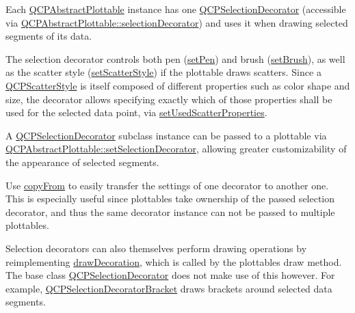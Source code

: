 Each \mbox{\hyperlink{class_q_c_p_abstract_plottable}{Q\+C\+P\+Abstract\+Plottable}} instance has one \mbox{\hyperlink{class_q_c_p_selection_decorator}{Q\+C\+P\+Selection\+Decorator}} (accessible via \mbox{\hyperlink{class_q_c_p_abstract_plottable_a7861518e47ca0c6a0c386032c2db075e}{Q\+C\+P\+Abstract\+Plottable\+::selection\+Decorator}}) and uses it when drawing selected segments of its data.

The selection decorator controls both pen (\mbox{\hyperlink{class_q_c_p_selection_decorator_ac2c8192e1e294aa3a4a7f32a859e3d76}{set\+Pen}}) and brush (\mbox{\hyperlink{class_q_c_p_selection_decorator_aa74b626be518ea17055f918d423c8c2d}{set\+Brush}}), as well as the scatter style (\mbox{\hyperlink{class_q_c_p_selection_decorator_ab403a613289714ff4fd4a0c0371ab116}{set\+Scatter\+Style}}) if the plottable draws scatters. Since a \mbox{\hyperlink{class_q_c_p_scatter_style}{Q\+C\+P\+Scatter\+Style}} is itself composed of different properties such as color shape and size, the decorator allows specifying exactly which of those properties shall be used for the selected data point, via \mbox{\hyperlink{class_q_c_p_selection_decorator_a808c1607cd4e83869c04986e332455c0}{set\+Used\+Scatter\+Properties}}.

A \mbox{\hyperlink{class_q_c_p_selection_decorator}{Q\+C\+P\+Selection\+Decorator}} subclass instance can be passed to a plottable via \mbox{\hyperlink{class_q_c_p_abstract_plottable_a20e266ad646f8c4a7e4631040510e5d9}{Q\+C\+P\+Abstract\+Plottable\+::set\+Selection\+Decorator}}, allowing greater customizability of the appearance of selected segments.

Use \mbox{\hyperlink{class_q_c_p_selection_decorator_a467a8d5cfcab27e862a17c797ac27b8a}{copy\+From}} to easily transfer the settings of one decorator to another one. This is especially useful since plottables take ownership of the passed selection decorator, and thus the same decorator instance can not be passed to multiple plottables.

Selection decorators can also themselves perform drawing operations by reimplementing \mbox{\hyperlink{class_q_c_p_selection_decorator_a4f8eb49e277063845391e803ae23054a}{draw\+Decoration}}, which is called by the plottable\textquotesingle{}s draw method. The base class \mbox{\hyperlink{class_q_c_p_selection_decorator}{Q\+C\+P\+Selection\+Decorator}} does not make use of this however. For example, \mbox{\hyperlink{class_q_c_p_selection_decorator_bracket}{Q\+C\+P\+Selection\+Decorator\+Bracket}} draws brackets around selected data segments. 

